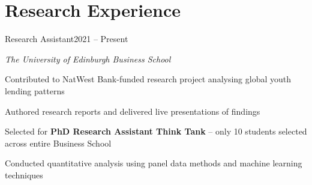 \section{Research Experience}

\begin{joblong}{Research Assistant}{2021 -- Present}
\item \textit{The University of Edinburgh Business School}
\item Contributed to NatWest Bank-funded research project analysing global youth lending patterns
\item Authored research reports and delivered live presentations of findings
\item Selected for \textbf{PhD Research Assistant Think Tank} -- only 10 students selected across entire Business School
\item Conducted quantitative analysis using panel data methods and machine learning techniques
\end{joblong}
